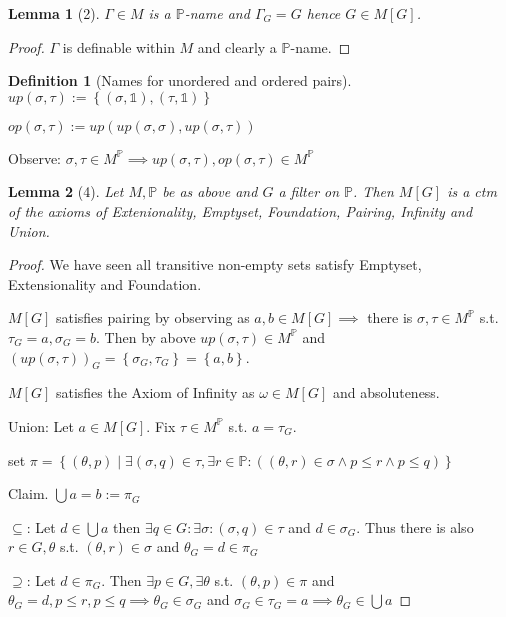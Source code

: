 \documentclass{scrartcl}
\newcommand{\set}[1]{\left\{#1\right\}}
\theoremstyle{definition}
\newtheorem*{definition*}{Definition}
\theoremstyle{plain}
\newtheorem*{lemma*}{Lemma}
\theoremstyle{remark}
\begin{document}
	\begin{lemma*}[2]
		$\Gamma \in M$ is a $\mathbb{P}$-name and $\Gamma_G = G$ hence $G \in M[G]$.
	\end{lemma*}

	\begin{proof}
		$\Gamma$ is definable within $M$ and clearly a $\mathbb{P}$-name.
	\end{proof}

	\begin{definition*}[Names for unordered and ordered pairs]
		$up(\sigma, \tau) := \set{(\sigma, \mathbb{1}), (\tau, \mathbb{1})}$
		
		$op(\sigma, \tau) := up(up(\sigma, \sigma), up(\sigma, \tau))$

		Observe: $\sigma, \tau \in M^\mathbb{P} \implies up(\sigma, \tau), 
		op(\sigma, \tau)\in M^\mathbb{P}$ 
	\end{definition*}

	\begin{lemma*}[4]
		Let $M, \mathbb{P}$ be as above and $G$ a filter on $\mathbb{P}$. Then
		$M[G]$ is a ctm of the axioms of Extenionality, Emptyset, Foundation, Pairing,
		Infinity and Union.
	\end{lemma*}

	\begin{proof}
		We have seen all transitive non-empty sets satisfy Emptyset, Extensionality and
		Foundation.

		$M[G]$ satisfies pairing by observing as $a, b \in M[G] \implies$
		there is $\sigma, \tau \in M^\mathbb{P}$ s.t. $\tau_G = a, \sigma_G = b$. 
		Then by above $up(\sigma, \tau) \in M^\mathbb{P}$ and $(up(\sigma, \tau))_G =
		\set{\sigma_G, \tau_G} = \set{a, b}$.

		$M[G]$ satisfies the Axiom of Infinity as $\omega \in M[G]$ and absoluteness.

		Union: Let $a \in M[G]$. Fix $\tau \in M^\mathbb{P}$ s.t. $a = \tau_G$.
		
		set $\pi = \set{ (\theta, p) \mid \exists (\sigma, q) \in \tau, 
		\exists r \in \mathbb{P}: ((\theta, r) \in \sigma\land p \leq r \land p \leq q)}$
	
		Claim. $\bigcup a = b := \pi_G$
		
		$\subseteq$: Let $d \in \bigcup a$ then $\exists q \in G: \exists \sigma: 
		(\sigma, q) \in \tau$ and 
		$d \in \sigma_G$. Thus there is also $r \in G, \theta$ s.t. $(\theta, r)\in \sigma$
		and $\theta_G = d \in \pi_G$ 
		
		$\supseteq$: Let $d \in \pi_G$. Then $\exists p \in G, \exists \theta$ s.t.
		$(\theta, p) \in \pi$ and $\theta_G = d,  
		p \leq r, p \leq q \implies \theta_G \in \sigma_G$ and
		$\sigma_G \in \tau_G = a \implies \theta_G \in \bigcup a$
	\end{proof}
\end{document}
